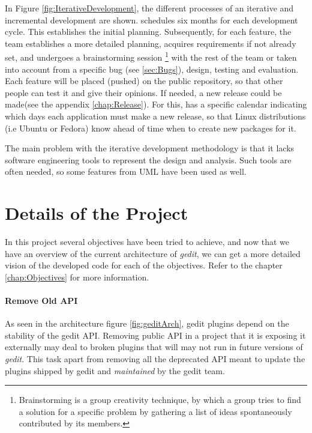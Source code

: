 In Figure \ref{fig:IterativeDevelopment}, the different processes of an iterative and 
incremental development are shown.  \GNOME schedules six months for each development 
cycle. This establishes the initial planning. Subsequently, for each feature, the 
team establishes a more detailed planning, acquires requirements if not already set, 
and undergoes a brainstorming session \footnote{Brainstorming is a group creativity 
technique, by which a group tries to find a solution for a specific problem by gathering 
a list of ideas spontaneously contributed by its members.} with the rest of the team 
or taken into account from a specific bug (see \ref{sec:Bugs}), design, testing and 
evaluation. Each feature will be placed (pushed) on the public repository,  so that 
other people can test it and give their opinions. If needed, a new release could be 
made(see the appendix \ref{chap:Release}).  For this, \GNOME has a specific calendar 
indicating which days each application must make a new release, so that Linux 
distributions (i.e Ubuntu or Fedora) know ahead of time when to create new packages for it.

The main problem with the iterative development methodology is that it lacks software 
engineering tools to represent the design and analysis.  Such tools are often needed, 
so some features from UML have been used as well.


\section{Details of the Project}

In this project several objectives have been tried to achieve, and now that we have 
an overview of the current architecture of \emph{gedit}, we can get a more detailed 
vision of the developed code for each of the objectives. Refer to the chapter 
\ref{chap:Objectives} for more information.

\paragraph{Remove Old API}

As seen in the architecture figure \ref{fig:geditArch}, gedit plugins depend 
on the stability of the gedit API. Removing public API in a project that it is 
exposing it externally may deal to broken plugins that will may not run in future 
versions of \emph{gedit}. This task apart from removing all the deprecated API 
meant to update the plugins shipped by gedit and \emph{maintained} by the gedit team.

